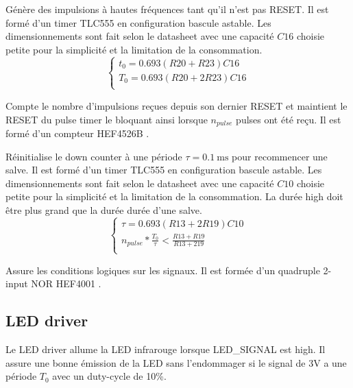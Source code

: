 \documentclass[french]{layout/Report}
\begin{document}
\begin{description}[leftmargin=!,labelwidth=3cm, labelindent=\parindent]
	\item[Pulse timer] Génère des impulsions à hautes fréquences tant qu'il n'est pas RESET. Il est formé d'un timer TLC555 en configuration bascule astable. Les dimensionnements sont fait selon le datasheet \cite{TLC555} avec une capacité $\mathit{C16}$ choisie petite pour la simplicité et la limitation de la consommation.
		\begin{equation*}
			\begin{cases}
				t_0 = 0.693(\mathit{R20}+\mathit{R23})\mathit{C16} \\
				T_0 = 0.693(\mathit{R20}+2\mathit{R23})\mathit{C16} \\
			\end{cases}
		\end{equation*}
	\item[Down counter] Compte le nombre d'impulsions reçues depuis son dernier RESET et maintient le RESET du pulse timer le bloquant ainsi lorsque $n_{pulse}$ pulses ont été reçu. Il est formé d'un compteur HEF4526B \cite{HEF4526B}.
	\item[Burst timer] Réinitialise le down counter à une période $\tau = \SI{0.1}{\milli\second}$ pour recommencer une salve. Il est formé d'un timer TLC555 en configuration bascule astable. Les dimensionnements sont fait selon le datasheet \cite{TLC555} avec une capacité $\mathit{C10}$ choisie petite pour la simplicité et la limitation de la consommation. La durée high doit être plus grand que la durée durée d'une salve.
		\begin{equation*}
			\begin{cases}
				\tau = 0.693(\mathit{R13}+2\mathit{R19})\mathit{C10} \\
				n_{pulse}*\frac{T_0}{\tau} < \frac{\mathit{R13}+\mathit{R19}}{\mathit{R13}+2\mathit{19}} \\
			\end{cases}
		\end{equation*}
	\item[Logic] Assure les conditions logiques sur les signaux. Il est formée d'un quadruple 2-input NOR HEF4001 \cite{HEF4001B}.
\end{description}

\subsection{LED driver}
\label{subsec:LED_driver}
Le LED driver allume la LED infrarouge lorsque LED\_SIGNAL est high. Il assure une bonne émission de la LED sans l'endommager si le signal de 3V a une période $T_0$ avec un duty-cycle de 10\%.
\end{document}
